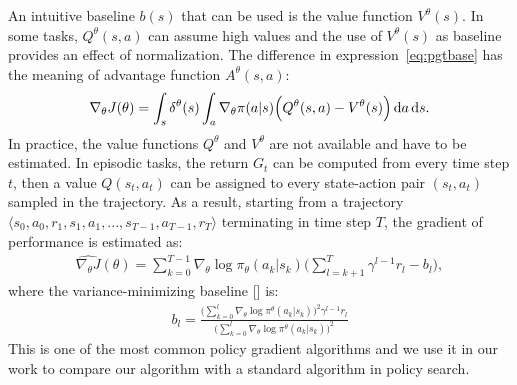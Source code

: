 An intuitive baseline $b(s)$ that can be used is the value function $V^{\theta}(s)$. In some tasks, $Q^{\theta}(s,a)$ can assume high values and the use of $V^{\theta}(s)$ as baseline provides an effect of normalization. The difference in expression~\eqref{eq:pgtbase} has the meaning of advantage function $A^{\theta}(s,a)$:
\begin{align} \nabla_{\theta}J(\theta) = \int_s \delta^{\theta}(s) \int_a \nabla_{\theta} \pi(a|s) \Big( Q^{\theta}(s,a) - V^{\theta}(s) \Big) \,\mathrm{d} a \,\mathrm{d} s.\end{align}
In practice, the value functions $Q^{\theta}$ and $V^{\theta}$ are not available and have to be estimated. In episodic tasks, the return $G_t$ can be computed from every time step $t$, then a value $Q(s_t, a_t)$ can be assigned to every state-action pair $(s_t, a_t)$ sampled in the trajectory. As a result, starting from a trajectory $\langle s_0, a_0, r_1, s_1, a_1, ..., s_{T-1}, a_{T-1}, r_{T} \rangle$ terminating in time step $T$, the gradient of performance is estimated as:
\begin{align}
\widehat{\nabla_{\theta}J}(\theta) = \sum_{k=0}^{T-1} \nabla_{\theta}\log\pi_{\theta}(a_k|s_k)\Big(\sum_{l=k+1}^{T}\gamma^{l-1}r_{l} - b_{l} \Big),
\end{align}
where the variance-minimizing baseline [\cite{Peters2008ReinforcementLO}] is: 
\begin{align} b_l = \frac{\Big( \sum_{k=0}^{l}\nabla_{\theta} \log\pi^{\theta}(a_k|s_k)\Big)^2 \gamma^{l-1}r_l} {\Big( \sum_{k=0}^{l}\nabla_{\theta} \log\pi^{\theta}(a_k|s_k)\Big)^2}
\end{align} 
This is one of the most common policy gradient algorithms and we use it in our work to compare our algorithm with a standard algorithm in policy search.

